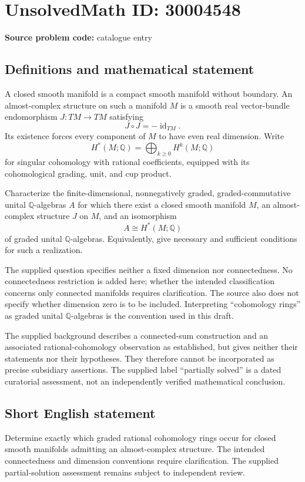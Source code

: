 \documentclass[11pt]{article}
\newcommand{\Q}{\mathbb{Q}}
\begin{document}
\section*{UnsolvedMath ID: 30004548}
\textbf{Source problem code:} catalogue entry
\subsection{Definitions and mathematical statement}
A closed smooth manifold is a compact smooth manifold without boundary. An almost-complex structure on such a manifold \(M\) is a smooth real vector-bundle endomorphism \(J:TM\to TM\) satisfying
\[
J\circ J=-\operatorname{id}_{TM}.
\]
Its existence forces every component of \(M\) to have even real dimension. Write
\[
H^*(M;\Q)=\bigoplus_{k\geq 0}H^k(M;\Q)
\]
for singular cohomology with rational coefficients, equipped with its cohomological grading, unit, and cup product.

Characterize the finite-dimensional, nonnegatively graded, graded-commutative unital \(\Q\)-algebras \(A\) for which there exist a closed smooth manifold \(M\), an almost-complex structure \(J\) on \(M\), and an isomorphism
\[
A\cong H^*(M;\Q)
\]
of graded unital \(\Q\)-algebras. Equivalently, give necessary and sufficient conditions for such a realization.

The supplied question specifies neither a fixed dimension nor connectedness. No connectedness restriction is added here; whether the intended classification concerns only connected manifolds requires clarification. The source also does not specify whether dimension zero is to be included. Interpreting ``cohomology rings'' as graded unital \(\Q\)-algebras is the convention used in this draft.

The supplied background describes a connected-sum construction and an associated rational-cohomology observation as established, but gives neither their statements nor their hypotheses. They therefore cannot be incorporated as precise subsidiary assertions. The supplied label ``partially solved'' is a dated curatorial assessment, not an independently verified mathematical conclusion.
\subsection{Short English statement}
Determine exactly which graded rational cohomology rings occur for closed smooth manifolds admitting an almost-complex structure. The intended connectedness and dimension conventions require clarification. The supplied partial-solution assessment remains subject to independent review.
\end{document}
